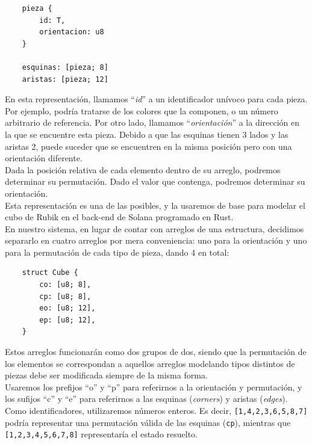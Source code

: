 \begin{multicols}{2}
\begin{verbatim}
    pieza {
        id: T,
        orientacion: u8
    }

    esquinas: [pieza; 8]
    aristas: [pieza; 12]
\end{verbatim}

En esta representación, llamamos ``\textit{id}'' a un identificador unívoco para cada pieza. Por ejemplo, podría tratarse de los colores que la componen, o un número arbitrario de referencia.
Por otro lado, llamamos ``\textit{orientación}'' a la dirección en la que se encuentre esta pieza. Debido a que las esquinas tienen 3 lados y las aristas 2, puede suceder que se encuentren en la misma posición pero con una orientación diferente.\\

Dada la posición relativa de cada elemento dentro de su arreglo, podremos determinar su permutación. Dado el valor que contenga, podremos determinar su orientación.\\

Esta representación es una de las posibles, y la usaremos de base para modelar el cubo de Rubik en el back-end de Solana programado en Rust\cite{rust}.\\

En nuestro sistema, en lugar de contar con arreglos de una estructura, decidimos separarlo en cuatro arreglos por mera conveniencia: uno para la orientación y uno para la permutación de cada tipo de pieza, dando 4 en total:

\begin{verbatim}
    struct Cube {
        co: [u8; 8],
        cp: [u8; 8],
        eo: [u8; 12],
        ep: [u8; 12],
    }
\end{verbatim}

Estos arreglos funcionarán como dos grupos de dos, siendo que la permutación de los elementos se correspondan a aquellos arreglos modelando tipos distintos de piezas debe ser modificada siempre de la misma forma.\\

Usaremos los prefijos ``o'' y ``p'' para referirnos a la orientación y permutación, y los sufijos ``c'' y ``e'' para referirnos a las esquinas (\textit{corners}) y aristas (\textit{edges}).\\

Como identificadores, utilizaremos números enteros. Es decir, \texttt{[1,4,2,3,6,5,8,7]} podría representar una permutación válida de las esquinas (\texttt{cp}), mientras que \texttt{[1,2,3,4,5,6,7,8]} representaría el estado resuelto.\\


\end{multicols}
